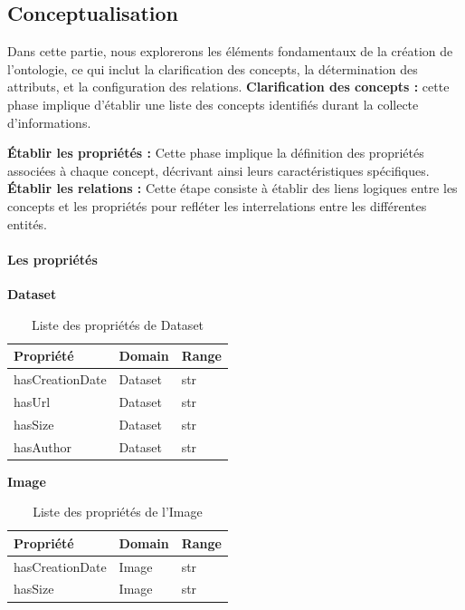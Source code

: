 \subsection{Conceptualisation}
Dans cette partie, nous explorerons les éléments fondamentaux de la création de l'ontologie, ce qui inclut la clarification des concepts, la détermination des attributs, et la configuration des relations.
\textbf{ Clarification des concepts : } cette phase implique d'établir une liste des concepts identifiés durant la collecte d'informations.

\textbf{ Établir les propriétés : }Cette phase implique la définition des propriétés associées à chaque concept, décrivant ainsi leurs caractéristiques spécifiques. \\

\textbf{ Établir les relations : }Cette étape consiste à établir des liens logiques entre les concepts et les propriétés pour refléter les interrelations entre les différentes entités.

\paragraph{Les propriétés}

\noindent\textbf{Dataset}
\begin{table}[H]
	\centering
	\begin{tabular}{|p{5cm}|p{5cm}|p{5cm}|}
		\hline
		\textbf{Propriété} & \textbf{Domain} & \textbf{Range} \\
		\hline
		hasCreationDate & Dataset & str \\
		\hline
		hasUrl & Dataset & str \\
		\hline
		hasSize & Dataset & str \\
		\hline
		hasAuthor & Dataset & str \\
		\hline
	\end{tabular}
	\caption{Liste des propriétés de Dataset}
\end{table}

\FloatBarrier %

\noindent\textbf{Image}
\begin{table}[H]
	\centering
	\begin{tabular}{|p{5cm}|p{5cm}|p{5cm}|}
		\hline
		\textbf{Propriété} & \textbf{Domain} & \textbf{Range} \\
		\hline
		hasCreationDate & Image & str \\
		\hline
		hasSize & Image & str \\
		\hline
	\end{tabular}
	\caption{Liste des propriétés de l'Image}
\end{table}

